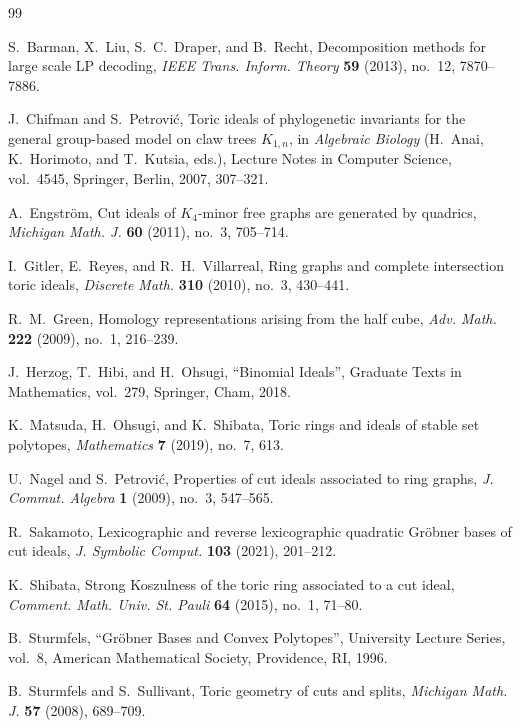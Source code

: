\documentclass[11pt]{amsart}
\theoremstyle{definition}
\numberwithin{equation}{section}
\begin{document}
\begin{thebibliography}{99}

S.~Barman, X.~Liu, S.~C.~Draper, and B.~Recht,
Decomposition methods for large scale LP decoding,
\emph{IEEE Trans. Inform. Theory} \textbf{59} (2013), no.~12, 7870--7886.



J.~Chifman and S.~Petrovi\'c,
Toric ideals of phylogenetic invariants for the general
group-based model on claw trees $K_{1,n}$,
in \emph{Algebraic Biology}
(H.~Anai, K.~Horimoto, and T.~Kutsia, eds.),
Lecture Notes in Computer Science, vol.~4545,
Springer, Berlin, 2007, 307--321.


A.~Engstr\"om,
Cut ideals of $K_4$-minor free graphs are generated by quadrics,
\emph{Michigan Math. J.} \textbf{60} (2011), no.~3, 705--714.



I.~Gitler, E.~Reyes, and R.~H.~Villarreal,
Ring graphs and complete intersection toric ideals,
\emph{Discrete Math.} \textbf{310} (2010), no.~3, 430--441.

R.~M.~Green,
Homology representations arising from the half cube,
\textit{Adv. Math.} \textbf{222} (2009), no.~1, 216--239.

J.~Herzog, T.~Hibi, and H.~Ohsugi,
``Binomial Ideals'',
Graduate Texts in Mathematics, vol.~279,
Springer, Cham, 2018.

K.~Matsuda, H.~Ohsugi, and K.~Shibata,
Toric rings and ideals of stable set polytopes,
\emph{Mathematics} \textbf{7} (2019), no.~7, 613.

U.~Nagel and S.~Petrovi\'c,
Properties of cut ideals associated to ring graphs,
\emph{J. Commut. Algebra} \textbf{1} (2009), no.~3, 547--565.


R.~Sakamoto,
Lexicographic and reverse lexicographic quadratic Gr\"obner bases of cut ideals,
\emph{J. Symbolic Comput.} \textbf{103} (2021), 201--212.


K.~Shibata,
Strong Koszulness of the toric ring associated to a cut ideal,
{\it Comment. Math. Univ. St. Pauli} \textbf{64} (2015), no.~1, 71--80.

B.~Sturmfels,
``Gr\"obner Bases and Convex Polytopes'',
University Lecture Series, vol.~8, American Mathematical Society, Providence, RI, 1996.

B.~Sturmfels and S.~Sullivant,
Toric geometry of cuts and splits,
\emph{Michigan Math. J.} \textbf{57} (2008), 689--709.


\end{thebibliography}
\end{document}
